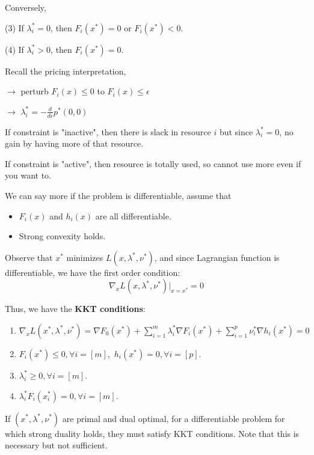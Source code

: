 Conversely,

	(3) If $\lambda_i^*=0$, then $F_i(x^*)=0$ or $F_i(x^*)<0$.
	
	(4) If $\lambda_i^*>0$, then $F_i(x^*)=0$.

\vspace{0.5cm}
Recall the pricing interpretation,

$\rightarrow$ perturb $F_i(x)\leq 0$ to $F_i(x)\leq \epsilon$

$\rightarrow$ $\lambda_i^* = - \frac{d}{d\epsilon}p^*(0,0)$


If constraint is "inactive", then there is slack in resource $i$ but since $\lambda_i^* = 0$, no gain by having more of that resource.

If constraint is "active", then resource is totally used, so cannot use more even if you want to.


\vspace{0.5cm}
We can say more if the problem is differentiable, assume that
\begin{itemize}
	\item $F_i(x)$ and $h_i(x)$ are all differentiable.
	
	\item Strong convexity holds.
\end{itemize}

Observe that $x^*$ minimizes $L(x,\lambda^*,\nu^*)$, and since Lagrangian function is differentiable, we have the first order condition:
\begin{equation*}
\nabla_x L(x,\lambda^*,\nu^*) {\vert}_{x=x^*} = 0
\end{equation*}

Thus, we have the \textbf{KKT conditions}:
\begin{enumerate}
	\item $\nabla_x L(x^*,\lambda^*,\nu^*) = \nabla F_0(x^*)+\sum^m_{i=1}\lambda^*_i \nabla F_i(x^*)+\sum^p_{i=1}\nu_i^*\nabla h_i(x^*)=0$
	
	\item $F_i(x^*) \leq 0,\forall i=[m]$,\  $h_i(x^*)=0,\forall i=[p]$.
	
	\item $\lambda_i^*\geq 0,\forall i=[m]$.
	
	\item $\lambda_i^*F_i(x_i^*)= 0,\forall i=[m]$.
\end{enumerate}

\begin{theorem}\label{kktnecessary}
	If $(x^*,\lambda^*,\nu^*)$ are primal and dual optimal, for a differentiable problem for which strong duality holds, they must satisfy KKT conditions. Note that this is necessary but not sufficient.
\end{theorem}


